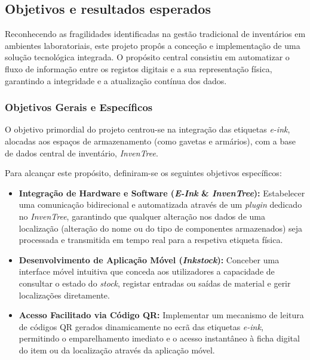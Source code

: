 \documentclass[10pt]{article}
\begin{document}
	
	\subsection{Objetivos e resultados esperados}

    Reconhecendo as fragilidades identificadas na gestão tradicional de inventários em ambientes laboratoriais, este projeto propôs a conceção e implementação de uma solução tecnológica integrada. O propósito central consistiu em automatizar o fluxo de informação entre os registos digitais e a sua representação física, garantindo a integridade e a atualização contínua dos dados.

    \subsubsection{Objetivos Gerais e Específicos}

    O objetivo primordial do projeto centrou-se na integração das etiquetas \textit{e-ink}, alocadas aos espaços de armazenamento (como gavetas e armários), com a base de dados central de inventário, \textit{InvenTree}.

	Para alcançar este propósito, definiram-se os seguintes objetivos específicos:
    
    \begin{itemize}
    \item \textbf{Integração de Hardware e Software (\textit{E-Ink} \& \textit{InvenTree}):} Estabelecer uma comunicação bidirecional e automatizada através de um \textit{plugin} dedicado no \textit{InvenTree}, garantindo que qualquer alteração nos dados de uma localização (alteração do nome ou do tipo de componentes armazenados) seja processada e transmitida em tempo real para a respetiva etiqueta física.
    \item \textbf{Desenvolvimento de Aplicação Móvel (\textit{Inkstock}):} Conceber uma interface móvel intuitiva que conceda aos utilizadores a capacidade de consultar o estado do \textit{stock}, registar entradas ou saídas de material e gerir localizações diretamente.
    \item \textbf{Acesso Facilitado via Código QR:} Implementar um mecanismo de leitura de códigos QR gerados dinamicamente no ecrã das etiquetas \textit{e-ink}, permitindo o emparelhamento imediato e o acesso instantâneo à ficha digital do item ou da localização através da aplicação móvel.
    \end{itemize}
\end{document}
